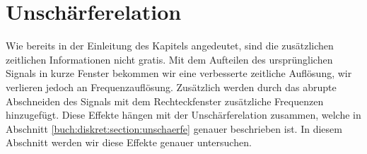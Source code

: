 %
%
%
%
\section{Unschärferelation
\label{sonogramm:section:teil1}}
Wie bereits in der Einleitung des Kapitels angedeutet, sind die zusätzlichen
zeitlichen Informationen nicht gratis. 
Mit dem Aufteilen des ursprünglichen Signals in kurze Fenster bekommen wir eine
verbesserte zeitliche Auflösung, wir verlieren jedoch an Frequenzauflösung.
Zusätzlich werden durch das abrupte Abschneiden des Signals mit dem Rechteckfenster
zusätzliche Frequenzen hinzugefügt. 
Diese Effekte hängen mit der Unschärferelation zusammen, welche in Abschnitt
\ref{buch:diskret:section:unschaerfe} genauer beschrieben ist.
In diesem Abschnitt werden wir diese Effekte genauer untersuchen.
